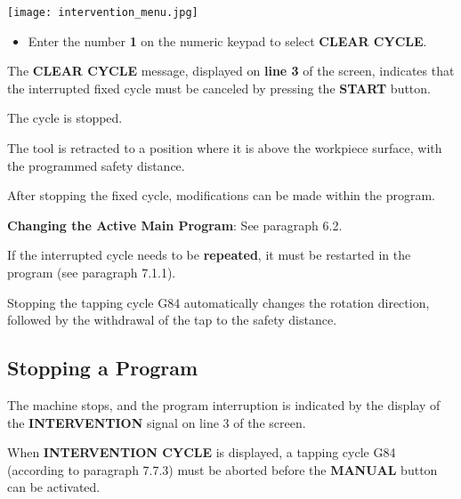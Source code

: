 \begin{center}
    \texttt{[image: intervention\_menu.jpg]}
\end{center}

\begin{itemize}
    \item Enter the number \textbf{1} on the numeric keypad to select \textbf{CLEAR CYCLE}.
\end{itemize}

The \textbf{CLEAR CYCLE} message, displayed on \textbf{line 3} of the screen,  
indicates that the interrupted fixed cycle must be canceled by pressing the \textbf{START} button.

\begin{itemize}
\end{itemize}

The cycle is stopped.

The tool is retracted to a position where it is above the workpiece surface,  
with the programmed safety distance.

After stopping the fixed cycle, modifications can be made within the program.

\textbf{Changing the Active Main Program}: See paragraph 6.2.

If the interrupted cycle needs to be \textbf{repeated}, it must be restarted in the program (see paragraph 7.1.1).

\notes

Stopping the tapping cycle G84 automatically changes the rotation direction, followed by the withdrawal of the tap to the safety distance.

\subsection{Stopping a Program}

\begin{itemize}
\end{itemize}

The machine stops, and the program interruption is indicated by the display of the \textbf{INTERVENTION} signal on line 3 of the screen.

\notes

When \textbf{INTERVENTION CYCLE} is displayed, a tapping cycle G84 (according to paragraph 7.7.3) must be aborted before the \textbf{MANUAL} button can be activated.



